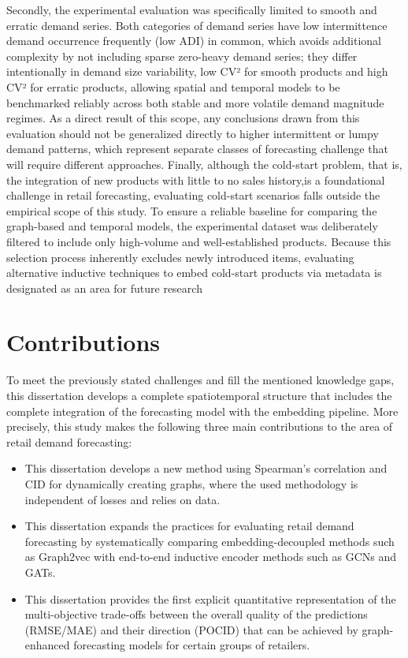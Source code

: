 Secondly, the experimental evaluation was specifically limited to smooth and erratic demand series. Both categories of demand series have low intermittence demand occurrence frequently (low ADI) in common, which avoids additional complexity by not including sparse zero-heavy demand series; they differ intentionally in demand size variability, low CV² for smooth products and high CV² for erratic products, allowing spatial and temporal models to be benchmarked reliably across both stable and more volatile demand magnitude regimes. As a direct result of this scope, any conclusions drawn from this evaluation should not be generalized directly to higher intermittent or lumpy demand patterns, which represent separate classes of forecasting challenge that will require different approaches.
Finally, although the cold-start problem, that is, the integration of new products with little to no sales history,is a foundational challenge in retail forecasting, evaluating cold-start scenarios falls outside the empirical scope of this study. To ensure a reliable baseline for comparing the graph-based and temporal models, the experimental dataset was deliberately filtered to include only high-volume and well-established products. Because this selection process inherently excludes newly introduced items, evaluating alternative inductive techniques to embed cold-start products via metadata is designated as an area for future research

\section{Contributions}\label{sec:contributions}
To meet the previously stated challenges and fill the mentioned knowledge gaps, this dissertation develops a complete spatiotemporal structure that includes the complete integration of the forecasting model with the embedding pipeline. More precisely, this study makes the following three main contributions to the area of retail demand forecasting:

\begin{itemize}
\item This dissertation develops a new method using Spearman’s correlation and CID for dynamically creating graphs, where the used methodology is independent of losses and relies on data.
\item This dissertation expands the practices for evaluating retail demand forecasting by systematically comparing embedding-decoupled methods such as Graph2vec with end-to-end inductive encoder methods such as GCNs and GATs. 
\item This dissertation provides the first explicit quantitative representation of the multi-objective trade-offs between the overall quality of the predictions (RMSE/MAE) and their direction (POCID) that can be achieved by graph-enhanced forecasting models for certain groups of retailers. 

\end{itemize}


